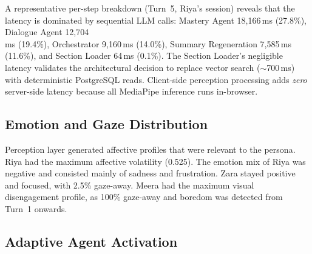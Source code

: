 \documentclass[conference, letterpaper]{IEEEtran}
\begin{document}
A representative per-step breakdown (Turn~5, Riya's session) reveals that the latency is dominated by sequential LLM calls: Mastery Agent 18,166\,ms (27.8\%), Dialogue Agent 12,704\,\\ms (19.4\%), Orchestrator 9,160\,ms (14.0\%), Summary Regeneration 7,585\,ms (11.6\%), and Section Loader 64\,ms (0.1\%). The Section Loader's negligible latency validates the architectural decision to replace vector search ($\sim$700\,ms) with deterministic PostgreSQL reads. Client-side perception processing adds \emph{zero} server-side latency because all MediaPipe inference runs in-browser.

\subsection{Emotion and Gaze Distribution}

\begin{table}[!t]
\centering
\caption{Primary emotion profiles inferred during the tutoring sessions.}
\label{tab:emotion_profiles}
\scriptsize
{}
\end{table}

Perception layer generated affective profiles that were relevant to the persona. Riya had the maximum affective volatility (0.525). The emotion mix of Riya was negative and consisted mainly of sadness and frustration. Zara stayed positive and focused, with 2.5\% gaze-away. Meera had the maximum visual disengagement profile, as 100\% gaze-away and boredom was detected from Turn~1 onwards.

\subsection{Adaptive Agent Activation}
\end{document}

